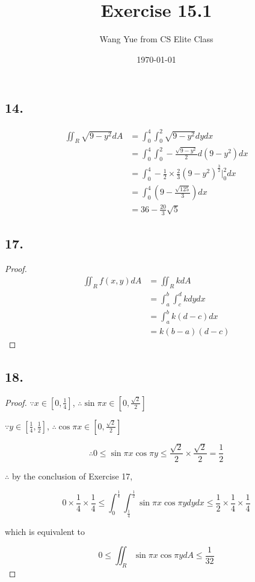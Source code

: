 \documentclass{article}
\begin{document}
  \title{Exercise 15.1}
  \author{Wang Yue from CS Elite Class}
  \date{\today}
  \maketitle


  \subsection*{14. }

  $$\begin{aligned}
    \iint_R \sqrt{9-y^2}dA &= \int_0^4 \int_0^2 \sqrt{9-y^2} dy dx \\
    &= \int_0^4 \int_0^2 -\frac{\sqrt{9-y^2}}{2} d(9-y^2) dx \\
    &= \int_0^4 -\frac 1 2 \times \frac 2 3 (9-y^2)^{\frac 3 2}\biggl|_0^2 dx \\
    &= \int_0^4(9-\frac{\sqrt{125}}{3}) dx \\
    &= 36 - \frac{20}{3}\sqrt{5}
  \end{aligned}$$

  \subsection*{17. }

  \begin{proof}
    $$\begin{aligned}
      \iint_R f(x, y)dA &= \iint_R k dA \\
      &= \int_a^b \int_c^d k dy dx \\
      &= \int_a^b k(d - c) dx \\
      &= k(b-a)(d-c)
    \end{aligned}$$
  \end{proof}

  \subsection*{18. }
  \begin{proof}
    $\because x \in [0, \frac 1 4]$, $\therefore \sin \pi x \in [0, \frac{\sqrt 2}{2}]$

    $\because y \in [\frac 1 4, \frac 1 2]$, $\therefore \cos \pi x \in [0, \frac{\sqrt 2}{2}]$

    $$\therefore 0 \leq \sin \pi x \cos \pi y \leq \frac{\sqrt 2}{2} \times \frac{\sqrt 2}{2} = \frac 1 2$$

    $\therefore $ by the conclusion of Exercise 17,

    $$0 \times \frac 1 4 \times \frac 1 4 \leq \int_0^{\frac 1 4}\int_{\frac 1 4}^{\frac 1 2}\sin \pi x \cos \pi y dy dx \leq \frac 1 2 \times \frac 1 4 \times \frac 1 4$$

    which is equivalent to

    $$0 \leq \iint_R \sin \pi x \cos \pi y dA \leq \frac{1}{32}$$
  \end{proof}
\end{document}
